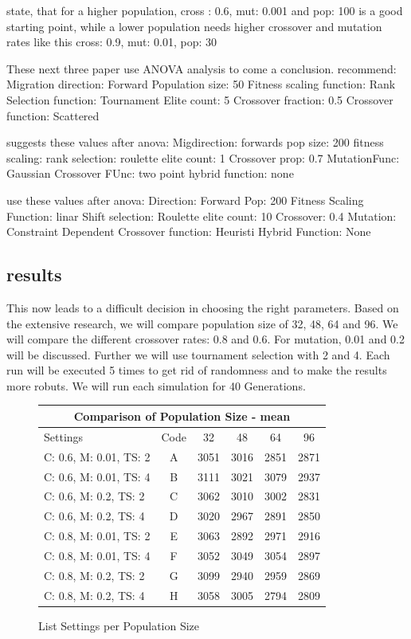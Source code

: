 \cite{srinivas_genetic_1994} state, that for a higher population, cross : 0.6, mut: 0.001 and pop: 100 is a good starting point, while a lower population needs higher crossover and mutation rates like this cross: 0.9, mut: 0.01, pop: 30

These next three paper use ANOVA analysis to come a conclusion. \cite{fazal_estimating_2005} recommend:
Migration direction: Forward
Population size: 50 
Fitness scaling function: Rank
Selection function: Tournament
Elite count: 5
Crossover fraction: 0.5
Crossover function: Scattered


\cite{dao_maximising_2016} suggests these values after anova:
Migdirection: forwards
pop size: 200
fitness scaling: rank
selection: roulette
elite count: 1
Crossover prop: 0.7
MutationFunc: Gaussian
Crossover FUnc: two point
hybrid function: none


\cite{assistant_professor_amity_university_jaipur_rajasthan_india_parameter_2019} use these values after anova:
Direction: Forward
Pop: 200 
Fitness Scaling Function: linar Shift
selection: Roulette 
elite count: 10 
Crossover: 0.4 
Mutation: Constraint Dependent 
Crossover function: Heuristi
Hybrid Function: None




\subsection{results}
This now leads to a difficult decision in choosing the right parameters. Based on the extensive research, we will compare population size of 32, 48, 64 and 96. We will compare the different crossover rates: 0.8 and 0.6. For mutation, 0.01 and 0.2 will be discussed. Further we will use tournament selection with 2 and 4.
Each run will be executed 5 times to get rid of randomness and to make the results more robuts. We will run each simulation for 40 Generations.

\begin{figure}[!h]
	\centering
\begin{tabular}{ |l|c||c|c|c|c|  }
	\hline
	\multicolumn{6}{|c|}{Comparison of Population Size - mean} \\
	\hline
	Settings & Code & 32 & 48 & 64 & 96\\
	\hline
	C: 0.6, M: 0.01, TS: 2   	& A & 3051 & 3016 & 2851 & 2871\\
	C: 0.6, M: 0.01, TS: 4		& B & 3111 & 3021 & 3079 & 2937\\
	C: 0.6, M: 0.2, TS: 2 		& C & 3062 & 3010 & 3002 & 2831\\
	C: 0.6, M: 0.2, TS: 4    	& D & 3020 & 2967 & 2891 & 2850\\
	C: 0.8, M: 0.01, TS: 2   	& E & 3063 & 2892 & 2971 & 2916\\
	C: 0.8, M: 0.01, TS: 4		& F & 3052 & 3049 & 3054 & 2897\\
	C: 0.8, M: 0.2, TS: 2 		& G & 3099 & 2940 & 2959 & 2869\\
	C: 0.8, M: 0.2, TS: 4    	& H & 3058 & 3005 & 2794 & 2809\\
	\hline
\end{tabular}
\caption{List Settings per Population Size}
\end{figure}


